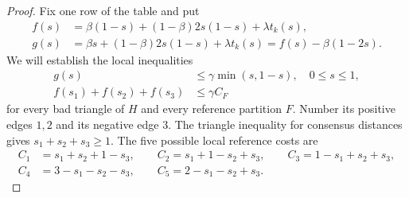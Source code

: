 \documentclass[11pt]{article}
\begin{document}
\begin{proof}
Fix one row of the table and put
\begin{align*}
 f(s)&=\beta(1-s)+(1-\beta)2s(1-s)+\lambda t_k(s),\\
 g(s)&=\beta s+(1-\beta)2s(1-s)+\lambda t_k(s)
      =f(s)-\beta(1-2s).
\end{align*}
We will establish the local inequalities
\begin{align}
 g(s)&\le\gamma\min(s,1-s),\quad 0\le s\le1,
   \label{eq:finite-centered-pair}\\
 f(s_1)+f(s_2)+f(s_3)&\le\gamma C_F
   \label{eq:finite-centered-triplet}
\end{align}
for every bad triangle of $H$ and every reference partition $F$.
Number its positive edges $1,2$ and its negative edge $3$. The triangle
inequality for consensus distances gives $s_1+s_2+s_3\ge1$.
The five possible local reference costs are
\[
\begin{split}
 C_1&=s_1+s_2+1-s_3,\qquad
 C_2=s_1+1-s_2+s_3,\qquad
 C_3=1-s_1+s_2+s_3,\\
 C_4&=3-s_1-s_2-s_3,\qquad
 C_5=2-s_1-s_2+s_3.
\end{split}
\]


\end{proof}
\end{document}
